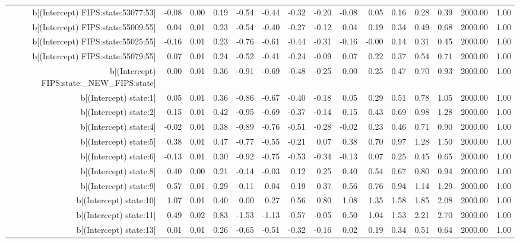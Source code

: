 \begin{table}[ht]
\begin{tabular}{rrrrrrrrrrrrrrr}
  b[(Intercept) FIPS:state:53077:53] & -0.08 & 0.00 & 0.19 & -0.54 & -0.44 & -0.32 & -0.20 & -0.08 & 0.05 & 0.16 & 0.28 & 0.39 & 2000.00 & 1.00 \\ 
  b[(Intercept) FIPS:state:55009:55] & 0.04 & 0.01 & 0.23 & -0.54 & -0.40 & -0.27 & -0.12 & 0.04 & 0.19 & 0.34 & 0.49 & 0.68 & 2000.00 & 1.00 \\ 
  b[(Intercept) FIPS:state:55025:55] & -0.16 & 0.01 & 0.23 & -0.76 & -0.61 & -0.44 & -0.31 & -0.16 & -0.00 & 0.14 & 0.31 & 0.45 & 2000.00 & 1.00 \\ 
  b[(Intercept) FIPS:state:55079:55] & 0.07 & 0.01 & 0.24 & -0.52 & -0.41 & -0.24 & -0.09 & 0.07 & 0.22 & 0.37 & 0.54 & 0.71 & 2000.00 & 1.00 \\ 
  b[(Intercept) FIPS:state:\_NEW\_FIPS:state] & 0.00 & 0.01 & 0.36 & -0.91 & -0.69 & -0.48 & -0.25 & 0.00 & 0.25 & 0.47 & 0.70 & 0.93 & 2000.00 & 1.00 \\ 
  b[(Intercept) state:1] & 0.05 & 0.01 & 0.36 & -0.86 & -0.67 & -0.40 & -0.18 & 0.05 & 0.29 & 0.51 & 0.78 & 1.05 & 2000.00 & 1.00 \\ 
  b[(Intercept) state:2] & 0.15 & 0.01 & 0.42 & -0.95 & -0.69 & -0.37 & -0.14 & 0.15 & 0.43 & 0.69 & 0.98 & 1.28 & 2000.00 & 1.00 \\ 
  b[(Intercept) state:4] & -0.02 & 0.01 & 0.38 & -0.89 & -0.76 & -0.51 & -0.28 & -0.02 & 0.23 & 0.46 & 0.71 & 0.90 & 2000.00 & 1.00 \\ 
  b[(Intercept) state:5] & 0.38 & 0.01 & 0.47 & -0.77 & -0.55 & -0.21 & 0.07 & 0.38 & 0.70 & 0.97 & 1.28 & 1.50 & 2000.00 & 1.00 \\ 
  b[(Intercept) state:6] & -0.13 & 0.01 & 0.30 & -0.92 & -0.75 & -0.53 & -0.34 & -0.13 & 0.07 & 0.25 & 0.45 & 0.65 & 2000.00 & 1.00 \\ 
  b[(Intercept) state:8] & 0.40 & 0.00 & 0.21 & -0.14 & -0.03 & 0.12 & 0.25 & 0.40 & 0.54 & 0.67 & 0.80 & 0.94 & 2000.00 & 1.00 \\ 
  b[(Intercept) state:9] & 0.57 & 0.01 & 0.29 & -0.11 & 0.04 & 0.19 & 0.37 & 0.56 & 0.76 & 0.94 & 1.14 & 1.29 & 2000.00 & 1.00 \\ 
  b[(Intercept) state:10] & 1.07 & 0.01 & 0.40 & 0.00 & 0.27 & 0.56 & 0.80 & 1.08 & 1.35 & 1.58 & 1.85 & 2.08 & 2000.00 & 1.00 \\ 
  b[(Intercept) state:11] & 0.49 & 0.02 & 0.83 & -1.53 & -1.13 & -0.57 & -0.05 & 0.50 & 1.04 & 1.53 & 2.21 & 2.70 & 2000.00 & 1.00 \\ 
  b[(Intercept) state:13] & 0.01 & 0.01 & 0.26 & -0.65 & -0.51 & -0.32 & -0.16 & 0.02 & 0.19 & 0.34 & 0.51 & 0.64 & 2000.00 & 1.00 \\ 

\end{tabular}
\end{table}
